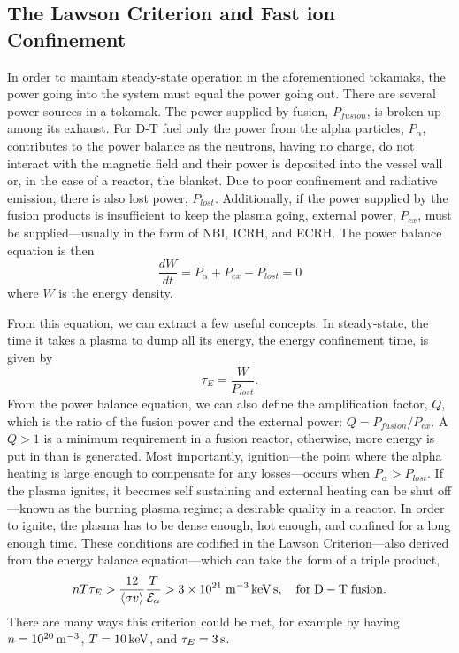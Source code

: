 \subsection{The Lawson Criterion and Fast ion Confinement}
In order to maintain steady-state operation in the aforementioned tokamaks, the power going into the system must equal the power going out. There are several power sources in a tokamak. The power supplied by fusion, $P_{fusion}$, is broken up among its exhaust. For D-T fuel only the power from the alpha particles, $P_\alpha$, contributes to the power balance as the neutrons, having no charge, do not interact with the magnetic field and their power is deposited into the vessel wall or, in the case of a reactor, the blanket. Due to poor confinement and radiative emission, there is also lost power, $P_{lost}$. Additionally, if the power supplied by the fusion products is insufficient to keep the plasma going, external power, $P_{ex}$, must be supplied---usually in the form of NBI, ICRH, and ECRH. The power balance equation is then
\begin{equation}\label{eq:power_balance}
    \frac{dW}{dt} = P_\alpha + P_{ex} - P_{lost} = 0
\end{equation}
where $W$ is the energy density.

From this equation, we can extract a few useful concepts. In steady-state, the time it takes a plasma to dump all its energy, the energy confinement time, is given by
\begin{equation}\label{eq:tau_e}
    \tau_E = \frac{W}{P_{lost}}.
\end{equation}
From the power balance equation, we can also define the amplification factor, $Q$, which is the ratio of the fusion power and the external power: $Q = P_{fusion}/P_{ex}$. A $Q > 1$ is a minimum requirement in a fusion reactor, otherwise, more energy is put in than is generated. Most importantly, ignition---the point where the alpha heating is large enough to compensate for any losses---occurs when $P_\alpha > P_{lost}$. If the plasma ignites, it becomes self sustaining and external heating can be shut off---known as the burning plasma regime; a desirable quality in a reactor.
In order to ignite, the plasma has to be dense enough, hot enough, and confined for a long enough time. These conditions are codified in the Lawson Criterion---also derived from the energy balance equation---which can take the form of a triple product,
\begin{equation}\label{eq:lawson}
    nT\tau_E > \frac{12}{\langle \sigma v \rangle} \frac{T}{\mathcal{E}_\alpha} > 3\times10^{21} \; \rm{m^{-3}\, keV\, s}, \quad \rm{for\;D-T\;fusion}.
\end{equation}
There are many ways this criterion could be met, for example by having $n = 10^{20}\, \rm{m^{-3}}$, $T = 10\,\rm{keV}$, and $\tau_E = 3\,\rm{s}$.

